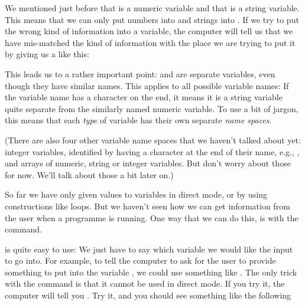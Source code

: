 \needspace{4cm} %
We mentioned just before that  is a numeric
variable and that  is a string variable. This
means that we can only put numbers into  and
strings into .  If we try to put the wrong kind
of information into a variable, the computer will tell us that we have
mis-matched the kind of information with the place we are trying to
put it by giving us a  like
this:


This leads us to a rather important point:  and
 are separate variables, even though they have
similar names.  This applies to all possible variable names: If the
variable name has a \screentextwide{\$} character on the end, it
means it is a string variable quite separate from the similarly named
numeric variable.  To use a bit of jargon, this means that each {\em type}
of variable has their own separate {\em name
  spaces}.

(There are also four other variable name
spaces that we haven't talked about yet: integer variables, identified
by having a \screentextwide{\%} character at the end of their name,
e.g., , and arrays of numeric, string or integer
variables. But don't worry about those for now.
We'll talk about those a bit later on.)

So far we have only given values to variables in direct mode, or
by using constructions like  loops.  But we
haven't seen how we can get information from the user when a programme
is running.  One way that we can do this, is with the
command.

\needspace{4cm} %
 is quite easy to use: We just have to say which
variable we would like the input to go into.  For example, to tell the
computer to ask for the user to provide something to put into the
variable , we could use something like
.  The only trick with the 
command is that it cannot be used in direct mode.
If you try it, the computer will tell you .
Try it, and you should see something like the following

